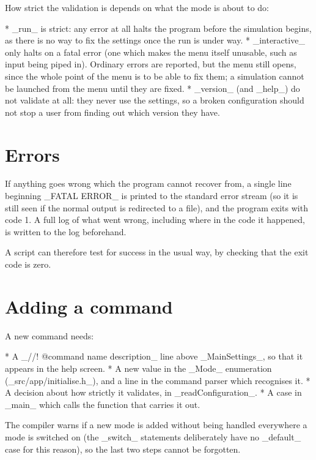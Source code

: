 	How strict the validation is depends on what the mode is about to do:

	* _run_ is strict: any error at all halts the program before the simulation begins, as there is no way to fix the settings once the run is under way.
	* _interactive_ only halts on a fatal error (one which makes the menu itself unusable, such as input being piped in). Ordinary errors are reported, but the menu still opens, since the whole point of the menu is to be able to fix them; a simulation cannot be launched from the menu until they are fixed.
	* _version_ (and _help_) do not validate at all: they never use the settings, so a broken configuration should not stop a user from finding out which version they have.

\section{Errors}

	If anything goes wrong which the program cannot recover from, a single line beginning _FATAL ERROR_ is printed to the standard error stream (so it is still seen if the normal output is redirected to a file), and the program exits with code 1. A full log of what went wrong, including where in the code it happened, is written to the log beforehand.

	A script can therefore test for success in the usual way, by checking that the exit code is zero.

\section{Adding a command}

	A new command needs:

	* A _//! @command name description_ line above _MainSettings_, so that it appears in the help screen.
	* A new value in the _Mode_ enumeration (_src/app/initialise.h_), and a line in the command parser which recognises it.
	* A decision about how strictly it validates, in _readConfiguration_.
	* A case in _main_ which calls the function that carries it out.

	The compiler warns if a new mode is added without being handled everywhere a mode is switched on (the _switch_ statements deliberately have no _default_ case for this reason), so the last two steps cannot be forgotten.
